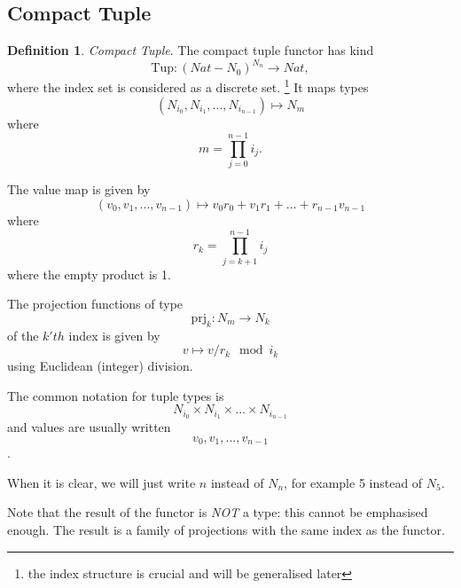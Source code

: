 \documentclass[oneside]{book}
\theoremstyle{plain}
\theoremstyle{definition}
\newtheorem{definition}{Definition}
\theoremstyle{plain}
\def\Nat{\mathit{Nat}}
\begin{document}
\subsection{Compact Tuple}
\begin{definition} {\em Compact Tuple}.
The compact tuple functor has kind 
$$\mathrm{Tup}: (Nat-N_0)^{\mathit{N_n}}\rightarrow \Nat,$$
where the index set is considered as a discrete set.
\footnote{the index structure is crucial and will be generalised later} 
It maps types
$$(N_{i_0}, N_{i_1}, ... , N_{i_{n-1}}) \mapsto N_m$$
where 
$$m=\prod_{j=0}^{n-1}i_j.$$ 

The value map is given by
$$(v_0, v_1, ... ,v_{n-1}) \mapsto
v_0  r_0 + v_1  r_1 + ... + r_{n-1}  v_{n-1}$$
where
$$r_k = \prod_{j=k+1}^{n-1}i_j$$
where the empty product is 1.
 
The projection functions of type 
$$\mathrm{prj}_k: N_m\rightarrow N_k$$
of the $k'th$ index is given by 
$$v \mapsto v / r_k \mod i_k$$
using Euclidean (integer) division.

The common notation for tuple types is
$$N_{i_0} \times N_{i_1} \times ... \times N_{i_{n-1}}$$
and values are usually written
$$v_0, v_1, ... ,v_{n-1}$$.

When it is clear, we will just write $n$ instead of $N_n$, for
example 5 instead of $N_5$.

Note that the result of the functor is {\em NOT} a type: this cannot be
emphasised enough. The result is a family of projections with the
same index as the functor.
\end{definition}
\end{document}
